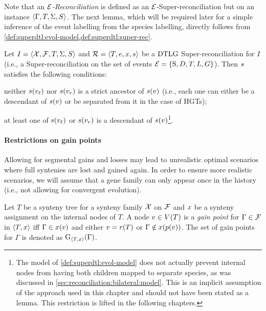 Note that an \emph{\(\mathcal{E}\)-Reconciliation} is defined as an
\(\mathcal{E}\)-Super-reconciliation but on an instance \(\left\langle\Gamma, T, \Sigma, S\right\rangle\).
The next lemma, which will be required later for a simple inference of the event labelling from the species labelling, directly follows from \cref{def:superdtl:evol-model,def:superdtl:super-rec}.

\begin{lemma}\label{lem:superdtl:synt-spe-coincide}
    Let \(I = \left\langle\mathcal{X}, \mathcal{F}, T, \Sigma, S\right\rangle\) and \(\mathcal{R} = \left\langle T, e, x, s\right\rangle\) be a \(\mathrm{DTLG}\) Super-reconciliation for \(I\) (i.e., a Super-reconciliation on the set of events \(\mathcal{E} = \{\mathrm{S}, D, T, L, G\}\)).
    Then \(s\) satisfies the following conditions:
    \begin{condition}
        \item neither \(s(v_\mathit{\ell})\) nor \(s(v_r)\) is a strict ancestor of \(s(v)\) (i.e., each one can either be a descendant of \(s(v)\) or be separated from it in the case of HGTs);
        \item at least one of \(s(v_\mathit{\ell})\) or \(s(v_r)\) is a descendant of \(s(v)\)\footnote{The model of \cref{def:superdtl:evol-model} does not actually prevent internal nodes from having both children mapped to separate species, as was discussed in \cref{sec:reconciliation:bilateral:model}. This is an implicit assumption of the approach used in this chapter and should not have been stated as a lemma. This restriction is lifted in the following chapters.}.
    \end{condition}
\end{lemma}

\paragraph{Restrictions on gain points}
Allowing for segmental gains and losses may lead to unrealistic optimal scenarios where full syntenies are lost and gained again.
In order to ensure more realistic scenarios, we will assume that a gene family can only appear once in the history (i.e., not allowing for convergent evolution).

\begin{definition}\label{def:superdtl-gain-point}
    Let \(T\) be a synteny tree for a synteny family \(\mathcal{X}\) on \(\mathcal{F}\) and \(x\) be a synteny assignment on the internal nodes of \(T\).
    A node \(v \in V(T)\) is a \emph{gain point}\/ for \(\Gamma \in \mathcal{F}\) in \(\left\langle T,x\right\rangle\) iff \(\Gamma \in x(v)\) and either \(v = r(T)\) or \(\Gamma \notin x(p(v))\).
    The set of gain points for \(\Gamma\) is denoted as \(\mathrm{G}_{\left\langle T,x\right\rangle}(\Gamma)\).
\end{definition}

